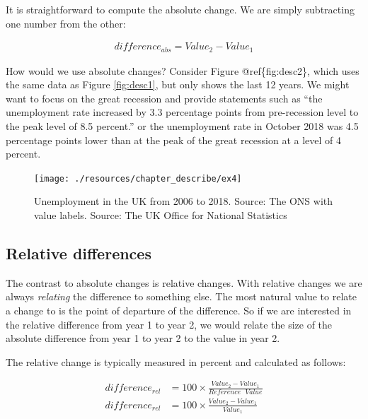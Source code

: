 \documentclass[
]{book}
\begin{document}
It is straightforward to compute the absolute change. We are simply subtracting one number from the other:

\begin{align}
  difference_{abs}=Value_2-Value_1
\end{align}

How would we use absolute changes? Consider Figure @ref\{fig:desc2\}, which uses the same data as Figure \ref{fig:desc1}, but only shows the last 12 years. We might want to focus on the great recession and provide statements such as ``the unemployment rate increased by 3.3 percentage points from pre-recession level to the peak level of 8.5 percent.'' or the unemployment rate in October 2018 was 4.5 percentage points lower than at the peak of the great recession at a level of 4 percent.

\begin{figure}

{\centering \texttt{[image: ./resources/chapter\_describe/ex4]} 

}

\caption{Unemployment in the UK from 2006 to 2018. Source: The ONS with value labels. Source: The UK Office for National Statistics}\label{fig:desc2}
\end{figure}

\hypertarget{relative-differences}{%
\subsection*{Relative differences}\label{relative-differences}}

The contrast to absolute changes is relative changes. With relative changes we are always \emph{relating} the difference to something else. The most natural value to relate a change to is the point of departure of the difference. So if we are interested in the relative difference from year 1 to year 2, we would relate the size of the absolute difference from year 1 to year 2 to the value in year 2.

The relative change is typically measured in percent and calculated as follows:

\begin{align}
  difference_{rel}&=100\times \frac{Value_2-Value_1}{Reference \text{ } Value}\nonumber\\
  difference_{rel}&=100\times \frac{Value_2-Value_1}{Value_1}\nonumber
\end{align}
\end{document}
